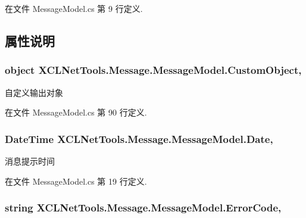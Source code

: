 在文件 Message\-Model.\-cs 第 9 行定义.



\subsection{属性说明}
\hypertarget{class_x_c_l_net_tools_1_1_message_1_1_message_model_a1f5c9fd605c8bfeb76563ccc8272510c}{
\subsubsection[{Custom\-Object}]{\setlength{\rightskip}{0pt plus 5cm}object X\-C\-L\-Net\-Tools.\-Message.\-Message\-Model.\-Custom\-Object\hspace{0.3cm}{\ttfamily [get]}, {\ttfamily [set]}}}\label{class_x_c_l_net_tools_1_1_message_1_1_message_model_a1f5c9fd605c8bfeb76563ccc8272510c}


自定义输出对象 



在文件 Message\-Model.\-cs 第 90 行定义.

\hypertarget{class_x_c_l_net_tools_1_1_message_1_1_message_model_a29a69610fff39e33d85105a5ca50dd20}{
\subsubsection[{Date}]{\setlength{\rightskip}{0pt plus 5cm}Date\-Time X\-C\-L\-Net\-Tools.\-Message.\-Message\-Model.\-Date\hspace{0.3cm}{\ttfamily [get]}, {\ttfamily [set]}}}\label{class_x_c_l_net_tools_1_1_message_1_1_message_model_a29a69610fff39e33d85105a5ca50dd20}


消息提示时间 



在文件 Message\-Model.\-cs 第 19 行定义.

\hypertarget{class_x_c_l_net_tools_1_1_message_1_1_message_model_a5c8290fdf8dd088943d6468819bc4d7c}{
\subsubsection[{Error\-Code}]{\setlength{\rightskip}{0pt plus 5cm}string X\-C\-L\-Net\-Tools.\-Message.\-Message\-Model.\-Error\-Code\hspace{0.3cm}{\ttfamily [get]}, {\ttfamily [set]}}}\label{class_x_c_l_net_tools_1_1_message_1_1_message_model_a5c8290fdf8dd088943d6468819bc4d7c}



